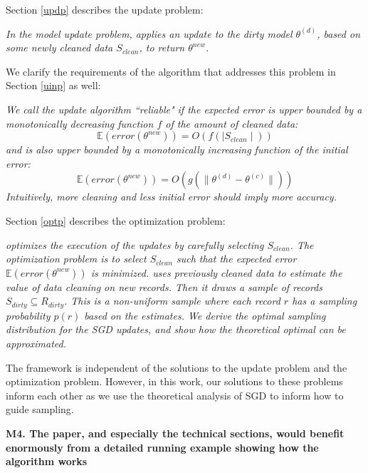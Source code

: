 \vspace{0.5em}

Section \ref{updp} describes the update problem:

\emph{In the model update problem, \sys applies an update to the dirty model $\theta^{(d)}$, based on some newly cleaned data $S_{clean}$, to return $\theta^{new}$.}

\vspace{0.5em}

We clarify the requirements of the algorithm that addresses this problem in Section \ref{uinp} as well:

\emph{We call the update algorithm ``reliable" if the expected error is upper bounded by a monotonically decreasing function $f$ of the amount of cleaned data:
\[
\mathbb{E}(error(\theta^{new})) = O(f(\mid S_{clean} \mid))
\]
and is also upper bounded by a monotonically increasing function of the initial error:
\[
\mathbb{E}(error(\theta^{new})) = O(g(\| \theta^{(d)} - \theta^{(c)} \|))
\]
Intuitively, more cleaning and less initial error should imply more accuracy.
}

\vspace{0.5em}

Section \ref{optp} describes the optimization problem:

\emph{\sys optimizes the execution of the updates by carefully selecting $S_{clean}$.
The optimization problem is to select $S_{clean}$ such that the expected error $\mathbb{E}(error(\theta^{new}))$ is minimized.
\sys uses previously cleaned data to estimate the value of data cleaning on new records.
Then it draws a sample of records $S_{dirty} \subseteq R_{dirty}$. This is a non-uniform sample where each record $r$ has a sampling probability $p(r)$ based on the estimates.
We derive the optimal sampling distribution for the SGD updates, and show how the theoretical optimal can be approximated.
}

\vspace{0.5em}

The \sys framework is independent of the solutions to the update problem and the optimization problem.
However, in this work, our solutions to these problems inform each other as we use the theoretical analysis of SGD to inform how to guide sampling. 

\vspace{0.5em}

\noindent\textbf{M4. The paper, and especially the technical sections, would benefit enormously from a detailed running example showing how the algorithm works}

